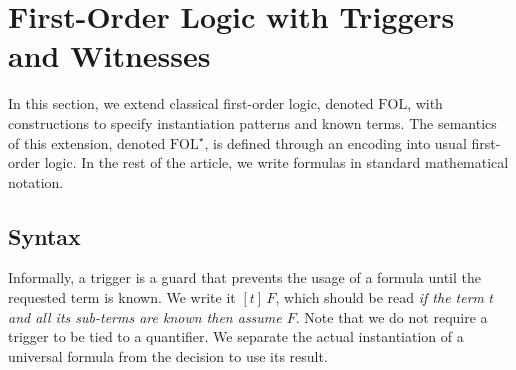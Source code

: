 \documentclass[]{easychair}
\newcommand{\FOL}{\mathrm{FOL}}
\newcommand{\FOLT}{\mathrm{FOL}^\star}
\newcommand{\ie}{{\em i.e.},\xspace}
\newcommand{\beforesec}{\vspace{0cm}}
\newcommand{\aftersec}{\vspace{0cm}}
\newcommand{\beforesub}{\vspace{0cm}}
\newcommand{\aftersub}{\vspace{0cm}}
\begin{document}
%
%
%

\beforesec
\section{\label{labeled-calculus}First-Order Logic with Triggers and Witnesses}
\aftersec

In this section, we extend classical first-order logic, denoted
$\FOL$, with constructions to specify instantiation patterns and
known terms. The semantics of this extension, denoted $\FOLT$,
is defined through an encoding into usual first-order logic.
In the rest of the article, we write formulas in standard
mathematical notation.

\beforesub
\subsection{\label{syntax} Syntax}
\aftersub
Informally, a trigger is a guard that prevents the usage of a formula until
the requested term is known. We write it $[t]\,F$, which should be read
\emph{if the term $t$ and all its sub-terms are known then assume $F$}.
Note that we do not require a trigger
to be tied to a quantifier. We separate the actual instantiation of a
universal formula from the decision to use its result.
\end{document}
